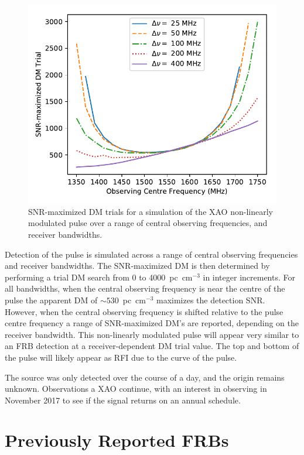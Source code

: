 \documentclass[a4paper,fleqn,usenatbib]{mnras}
\begin{document}
\begin{figure}
    \includegraphics[width=1.0\linewidth]{figures/simulatedRADARdm.pdf}
    \caption{SNR-maximized DM trials for a simulation of the XAO non-linearly
    modulated pulse over a range of central observing frequencies, and receiver
    bandwidths.
    }
    \label{fig:xao_simulated_dm}
\end{figure}

Detection of the pulse is simulated across a range of central observing
frequencies and receiver bandwidths. The SNR-maximized DM is then determined by
performing a trial DM search from 0 to 4000~pc~cm$^{-3}$ in integer increments.
For all bandwidths, when the central observing frequency is near the centre of
the pulse the apparent DM of $\sim530$~pc~cm$^{-3}$ maximizes the detection
SNR. However, when the central observing frequency is shifted relative to the
pulse centre frequency a range of SNR-maximized DM's are reported, depending on
the receiver bandwidth. This non-linearly modulated pulse will appear very
similar to an FRB detection at a receiver-dependent DM trial value. The top and
bottom of the pulse will likely appear as RFI due to the curve of the pulse.

The source was only detected over the course of a day, and the origin remains
unknown.  Observations a XAO continue, with an interest in observing in November
2017 to see if the signal returns on an annual schedule.

\section{Previously Reported FRBs}
\label{sec:previous_frbs}
\end{document}
